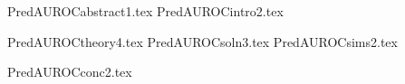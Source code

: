 \documentclass[12pt]{article}
\begin{document}






{PredAUROCabstract1.tex}
{PredAUROCintro2.tex}






{PredAUROCtheory4.tex}
{PredAUROCsoln3.tex}
{PredAUROCsims2.tex}





{PredAUROCconc2.tex}






\end{document}
